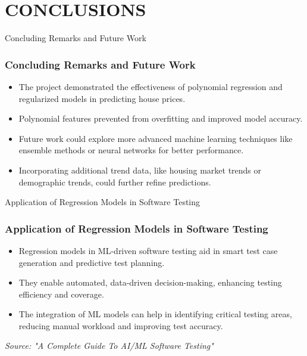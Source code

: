 \section{CONCLUSIONS}
\label{conclusion}


\begin{frame}{Concluding Remarks and Future Work}
    \frametitle{Concluding Remarks and Future Work}
    \begin{itemize}
        \item The project demonstrated the effectiveness of polynomial regression and regularized models in predicting house prices.
        \item Polynomial features prevented from overfitting and improved model accuracy.
        \item Future work could explore more advanced machine learning techniques like ensemble methods or neural networks for better performance.
        \item Incorporating additional trend data, like housing market trends or demographic trends, could further refine predictions.
    \end{itemize}
\end{frame}

\begin{frame}{Application of Regression Models in Software Testing}
    \frametitle{Application of Regression Models in Software Testing}
    \begin{itemize}
        \item Regression models in ML-driven software testing aid in smart test case generation and predictive test planning.
        \item They enable automated, data-driven decision-making, enhancing testing efficiency and coverage.
        \item The integration of ML models can help in identifying critical testing areas, reducing manual workload and improving test accuracy.
    \end{itemize}
    \vspace{1cm}
    \center
    \tiny
    \textit{Source: "A Complete Guide To AI/ML Software Testing" \cite{katalon_ai_ml_testing}}
\end{frame}

